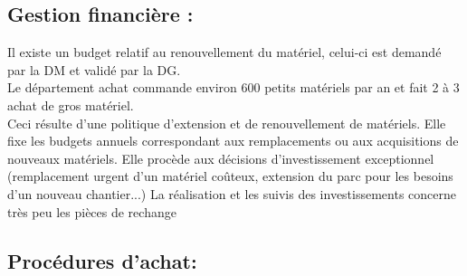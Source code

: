 \subsection{Gestion financière :}
Il existe un budget relatif au renouvellement du matériel, celui-ci est demandé par la DM et validé par la DG. \\
Le département achat commande environ 600 petits matériels par an et fait 2 à 3 achat de gros matériel. \\
Ceci résulte d'une politique d'extension et de renouvellement de matériels. Elle fixe les budgets annuels correspondant aux remplacements ou aux acquisitions de nouveaux matériels. Elle procède aux décisions d'investissement exceptionnel (remplacement urgent d'un matériel coûteux, extension du parc pour les besoins d'un nouveau chantier...)
La réalisation et les suivis des investissements concerne très peu les pièces de rechange



\subsection{Procédures d'achat:}

